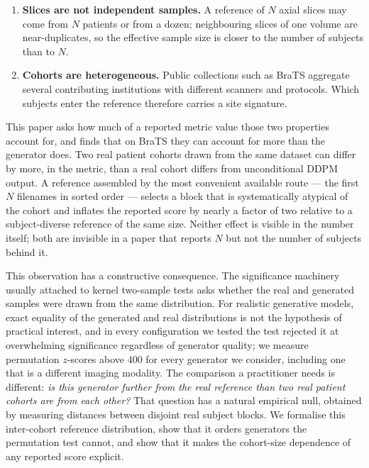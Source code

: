 \documentclass[preprint,12pt,authoryear]{elsarticle}
\begin{document}
\begin{enumerate}[leftmargin=*, topsep=2pt, itemsep=2pt]
\item \textbf{Slices are not independent samples.} A reference of $N$ axial
      slices may come from $N$ patients or from a dozen; neighbouring slices of
      one volume are near-duplicates, so the effective sample size is closer to
      the number of subjects than to $N$.
\item \textbf{Cohorts are heterogeneous.} Public collections such as BraTS
      aggregate several contributing institutions with different scanners and
      protocols. Which subjects enter the reference therefore carries a site
      signature.
\end{enumerate}

\noindent This paper asks how much of a reported metric value those two
properties account for, and finds that on BraTS they can account for more than
the generator does. Two real patient cohorts drawn from the same dataset can
differ by more, in the metric, than a real cohort differs from unconditional
DDPM output. A reference assembled by the most convenient available route ---
the first $N$ filenames in sorted order --- selects a block that is
systematically atypical of the cohort and inflates the reported score by nearly
a factor of two relative to a subject-diverse reference of the same size. Neither effect is visible in the
number itself; both are invisible in a paper that reports $N$ but not the number
of subjects behind it.

This observation has a constructive consequence. The significance machinery
usually attached to kernel two-sample tests asks whether the real and generated
samples were drawn from the same distribution. For realistic generative
models, exact equality of the generated and real distributions is not the
hypothesis of practical interest, and in every configuration we tested the test
rejected it at overwhelming significance regardless of generator quality; we measure
permutation $z$-scores above $400$ for every generator we consider, including
one that is a different imaging modality. The comparison a practitioner needs is
different: \emph{is this generator further from the real reference than two real
patient cohorts are from each other?} That question has a natural empirical
null, obtained by measuring distances between disjoint real subject blocks. We
formalise this inter-cohort reference distribution, show that it orders
generators the permutation test cannot, and show that it makes the cohort-size dependence of
any reported score explicit.
\end{document}
